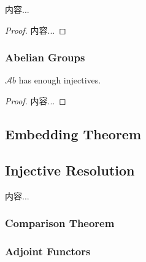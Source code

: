 \documentclass[Total.tex]{subfiles}
\begin{document}
			\begin{corollary}
				内容...
			\end{corollary}
			\begin{proof}
				内容...
			\end{proof}
			
			\subsubsection{Abelian Groups}
			
			\begin{corollary}
				$\mathcal Ab$ has enough injectives.
			\end{corollary}
			\begin{proof}
				内容...
			\end{proof}
			\subsection{Embedding Theorem}
			\subsection{Injective Resolution}
			\begin{Def}
				内容...
			\end{Def}
			
			\subsubsection{Comparison Theorem}
			
			\subsubsection{Adjoint Functors}
			
\end{document}
